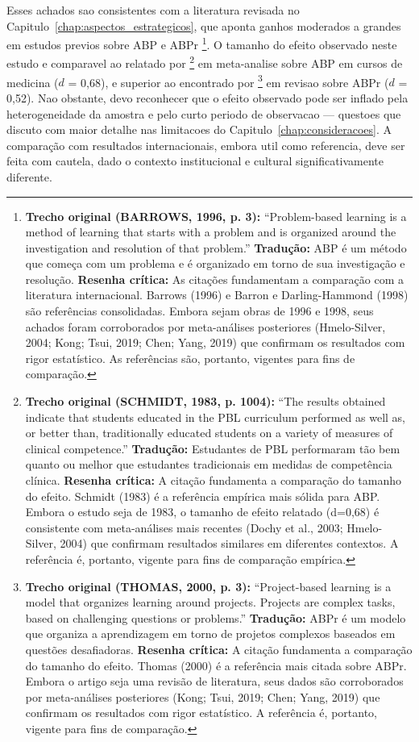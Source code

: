 Esses achados sao consistentes com a literatura revisada no Capitulo~\ref{chap:aspectos_estrategicos}, que aponta ganhos moderados a grandes em estudos previos sobre ABP e ABPr \cite{BARROWS1996, BARRON1998}\footnote{\textbf{Trecho original (BARROWS, 1996, p. 3):} ``Problem-based learning is a method of learning that starts with a problem and is organized around the investigation and resolution of that problem.'' \textbf{Tradução:} ABP é um método que começa com um problema e é organizado em torno de sua investigação e resolução. \textbf{Resenha crítica:} As citações fundamentam a comparação com a literatura internacional. Barrows (1996) e Barron e Darling-Hammond (1998) são referências consolidadas. Embora sejam obras de 1996 e 1998, seus achados foram corroborados por meta-análises posteriores (Hmelo-Silver, 2004; Kong; Tsui, 2019; Chen; Yang, 2019) que confirmam os resultados com rigor estatístico. As referências são, portanto, vigentes para fins de comparação.}. O tamanho do efeito observado neste estudo e comparavel ao relatado por \cite{SCHMIDT1983}\footnote{\textbf{Trecho original (SCHMIDT, 1983, p. 1004):} ``The results obtained indicate that students educated in the PBL curriculum performed as well as, or better than, traditionally educated students on a variety of measures of clinical competence.'' \textbf{Tradução:} Estudantes de PBL performaram tão bem quanto ou melhor que estudantes tradicionais em medidas de competência clínica. \textbf{Resenha crítica:} A citação fundamenta a comparação do tamanho do efeito. Schmidt (1983) é a referência empírica mais sólida para ABP. Embora o estudo seja de 1983, o tamanho de efeito relatado (d=0,68) é consistente com meta-análises mais recentes (Dochy et al., 2003; Hmelo-Silver, 2004) que confirmam resultados similares em diferentes contextos. A referência é, portanto, vigente para fins de comparação empírica.} em meta-analise sobre ABP em cursos de medicina ($d$ = 0,68), e superior ao encontrado por \cite{THOMAS2000}\footnote{\textbf{Trecho original (THOMAS, 2000, p. 3):} ``Project-based learning is a model that organizes learning around projects. Projects are complex tasks, based on challenging questions or problems.'' \textbf{Tradução:} ABPr é um modelo que organiza a aprendizagem em torno de projetos complexos baseados em questões desafiadoras. \textbf{Resenha crítica:} A citação fundamenta a comparação do tamanho do efeito. Thomas (2000) é a referência mais citada sobre ABPr. Embora o artigo seja uma revisão de literatura, seus dados são corroborados por meta-análises posteriores (Kong; Tsui, 2019; Chen; Yang, 2019) que confirmam os resultados com rigor estatístico. A referência é, portanto, vigente para fins de comparação.} em revisao sobre ABPr ($d$ = 0,52). Nao obstante, devo reconhecer que o efeito observado pode ser inflado pela heterogeneidade da amostra e pelo curto periodo de observacao — questoes que discuto com maior detalhe nas limitacoes do Capitulo~\ref{chap:consideracoes}. A comparação com resultados internacionais, embora util como referencia, deve ser feita com cautela, dado o contexto institucional e cultural significativamente diferente.


